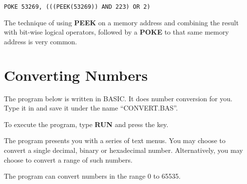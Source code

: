 \begin{tcolorbox}[colback=black,coltext=white]
\verbatimfont{\codefont}
\begin{verbatim}
POKE 53269, (((PEEK(53269)) AND 223) OR 2)
\end{verbatim}
\end{tcolorbox}

The technique of using {\bf PEEK} on a memory address and combining the result with bit-wise logical operators, followed by a {\bf POKE} to that same memory address is very common.

\section{Converting Numbers}

The program below is written in BASIC. It does number conversion for you. Type it in and save it under the name ``CONVERT.BAS''.

To execute the program, type {\bf RUN} and press the  key.

The program presents you with a series of text menus. You may choose to convert a single decimal, binary or hexadecimal number. Alternatively, you may choose to convert a range of such numbers.

The program can convert numbers in the range 0 to 65535.

